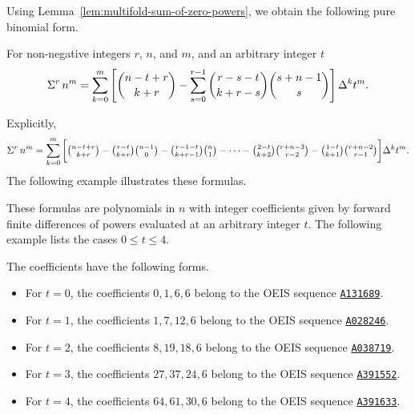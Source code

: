 Using Lemma~\eqref{lem:multifold-sum-of-zero-powers}, we obtain the following pure binomial form.
\begin{proposition}
  \label{prop:multifold-binomial-sums-of-powers}
  For non-negative integers $r$, $n$, and $m$, and an arbitrary integer $t$
  \begin{align*}
    \Sigma^{r}\,{n}^{m}
    = \sum_{k=0}^{m}
    \left[
      \binom{n-t+r}{k+r}
      -
      \sum_{s=0}^{r-1}
      \binom{r-s-t}{k+r-s}
      \binom{s+n-1}{s}
    \right] \Delta^{k} t^{m}.
  \end{align*}
\end{proposition}
Explicitly,
\begin{align*}
  \Sigma^{r}\,{n}^{m}
  = \sum_{k=0}^{m}
  \bigg[
    \tbinom{n-t+r}{k+r}
    -
    \tbinom{r-t}{k+r}
    \tbinom{n-1}{0}
    -
    \tbinom{r-1-t}{k+r-1}
    \tbinom{n}{1}
    -
    \cdots
    -
    \tbinom{2-t}{k+2}
    \tbinom{r+n-3}{r-2}
    -
    \tbinom{1-t}{k+1}
    \tbinom{r+n-2}{r-1}
  \bigg] \Delta^{k} t^{m}.
\end{align*}
The following example illustrates these formulas.

These formulas are polynomials in $n$ with integer coefficients given by forward finite differences of powers evaluated at an arbitrary integer $t$. The following example lists the cases $0\leq t\leq4$.

The coefficients have the following forms.
\begin{itemize}
  \item For $t=0$, the coefficients $0,1,6,6$ belong to the OEIS sequence \href{https://oeis.org/A131689}{\texttt{A131689}}.
  \item For $t=1$, the coefficients $1,7,12,6$ belong to the OEIS sequence \href{https://oeis.org/A028246}{\texttt{A028246}}.
  \item For $t=2$, the coefficients $8,19,18,6$ belong to the OEIS sequence \href{https://oeis.org/A038719}{\texttt{A038719}}.
  \item For $t=3$, the coefficients $27,37,24,6$ belong to the OEIS sequence \href{https://oeis.org/A391552}{\texttt{A391552}}.
  \item For $t=4$, the coefficients $64,61,30,6$ belong to the OEIS sequence \href{https://oeis.org/A391633}{\texttt{A391633}}.
\end{itemize}
